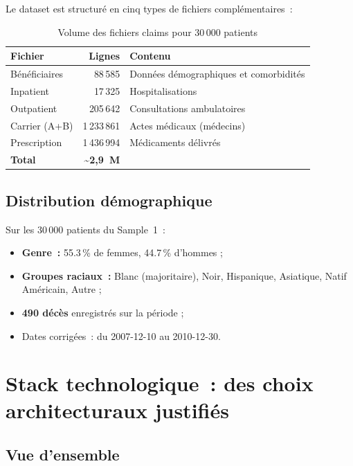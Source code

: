 Le dataset est structuré en cinq types de fichiers complémentaires~:

\begin{table}[htbp]
\centering
\caption{Volume des fichiers claims pour 30\,000 patients}
\label{tab:claims}
\begin{tabular}{@{}lrl@{}}
\toprule
\textbf{Fichier} & \textbf{Lignes} & \textbf{Contenu} \\
\midrule
Bénéficiaires  &   88\,585 & Données démographiques et comorbidités \\
Inpatient      &   17\,325 & Hospitalisations \\
Outpatient     &  205\,642 & Consultations ambulatoires \\
Carrier (A+B)  & 1\,233\,861 & Actes médicaux (médecins) \\
Prescription   & 1\,436\,994 & Médicaments délivrés \\
\midrule
\textbf{Total} & \textbf{\textasciitilde{}2,9~M} & \\
\bottomrule
\end{tabular}
\end{table}

\subsection{Distribution démographique}

Sur les 30\,000 patients du Sample~1~:
\begin{itemize}
  \item \textbf{Genre~:} 55.3\,\% de femmes, 44.7\,\% d'hommes ;
  \item \textbf{Groupes raciaux~:} Blanc (majoritaire), Noir, Hispanique,
        Asiatique, Natif Américain, Autre ;
  \item \textbf{490 décès} enregistrés sur la période ;
  \item Dates corrigées~: du 2007-12-10 au 2010-12-30.
\end{itemize}

\section{Stack technologique~: des choix architecturaux justifiés}

\subsection{Vue d'ensemble}

